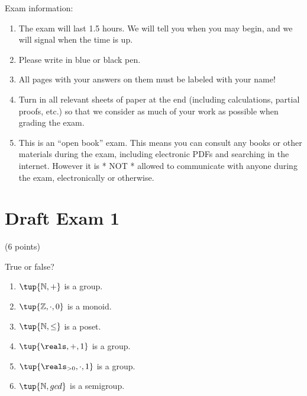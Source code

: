 \documentclass[paper=8.125in:10.250in,pagesize=pdftex,
    headinclude=false,footinclude=false,oneside,egregdoesnotlikesansseriftitles]{kaobook}
\begin{document}
Exam information: 
\begin{enumerate}
\item The exam will last 1.5 hours. We will tell you when you may begin, and we will signal when the time is up. 
\item Please write in blue or black pen. 
\item All pages with your answers on them must be labeled with your name!
\item Turn in all relevant sheets of paper at the end (including calculations, partial proofs, etc.) so that we consider as much of your work as possible when grading the exam. 
\item This is an ``open book'' exam. This means you can consult any books or other materials during the exam, including electronic PDFs and searching in the internet. However it is * NOT * allowed to communicate with anyone during the exam, electronically or otherwise. 
\end{enumerate}

\newpage

\section*{Draft Exam 1}


\begin{gradedexercise}\label{ex:AlgebraicGadgets}
(6 points) 
\

True or false? 
\begin{enumerate}
\item $\tup{\mathbb{N}, +}$ is a group. 
\item $\tup{\mathbb{Z}, \cdot, 0}$ is a monoid. 
\item $\tup{\mathbb{N}, \leq}$ is a poset. 
\item $\tup{\reals, +, 1}$ is a group.
\item $\tup{\reals_{>0}, \cdot, 1}$ is a group. 
\item $\tup{\mathbb{N}, gcd}$ is a semigroup. 
\end{enumerate}
\end{gradedexercise}


\newpage
\end{document}
